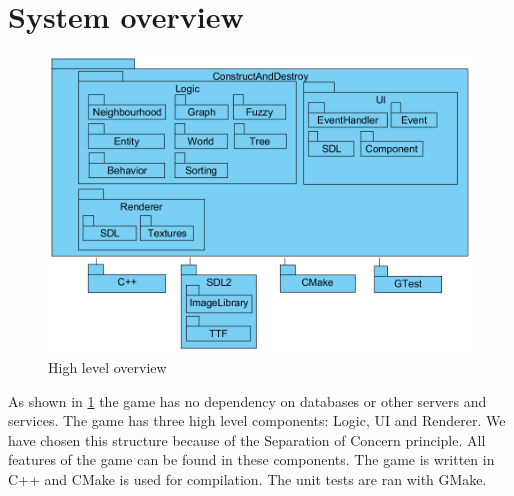 
\section{System overview}

\begin{figure}[H]
    \centering
    \includegraphics[scale=0.75]{res/high-level-overview.png}
    \caption{High level overview}\label{fig:system-overview}
\end{figure}

As shown in \cref{fig:system-overview} the game has no dependency on databases or other servers and services. The game has three high level components: Logic, UI and Renderer. We have chosen this structure because of the Separation of Concern principle. All features of the game can be found in these components. The game is written in C++ and CMake is used for compilation. The unit tests are ran with GMake.
